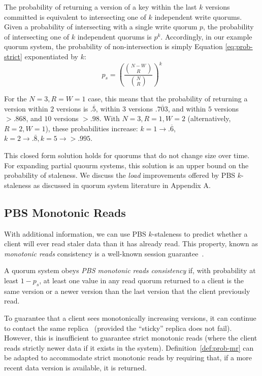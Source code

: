 \documentclass{vldb}
\begin{document}
The probability of returning a version of a key within the last $k$
versions committed is equivalent to intersecting one of $k$
independent write quorums.  Given a probability of intersecting with a
single write quorum $p$, the probability of intersecting one of $k$
independent quorums is $p^k$.  Accordingly, in our example quorum
system, the probability of non-intersection is simply Equation
\ref{eq:prob-strict} exponentiated by $k$:
\begin{equation}
\label{eq:k-consistency}
p_{s} = \left(\frac{{N-W \choose R}}{{N \choose R}}\right)^k
\end{equation}

For the $N=3, R=W=1$ case, this means that the probability of
returning a version within $2$ versions is $.\overline{5}$, within $3$
versions $.\overline{703}$, and within $5$ versions $> .868$, and $10$
versions $>.98$.  With $N=3, R=1, W=2$ (alternatively, $R=2, W=1$),
these probabilities increase: $k=1 \rightarrow
.\overline{6}$, $k=2 \rightarrow .\overline{8}, k=5 \rightarrow >
.995$.

This closed form solution holds for quorums that do not change size
over time.  For expanding partial quourm systems, this solution is an
upper bound on the probability of staleness.  We discuss the
\textit{load} improvements offered by PBS $k$-staleness as discussed
in quorum system literature in Appendix A.

\subsection{PBS Monotonic Reads}

With additional information, we can use PBS $k$-staleness to predict
whether a client will ever read staler data than it has already read.
This property, known as \textit{monotonic reads} consistency is a
well-known session guarantee~\cite{sessionguarantees}.

\begin{definition}
\label{def:prob-mr}
A quorum system obeys \textit{PBS monotonic reads consistency} if,
with probability at least $1-p_{s}$, at least one value in any
read quorum returned to a client is the same version or a newer
version than the last version that the client previously read.
\end{definition}

To guarantee that a client sees monotonically increasing versions, it
can continue to contact the same replica~\cite{vogels-defs} (provided
the ``sticky'' replica does not fail).  However, this is insufficient to
guarantee strict monotonic reads (where the client reads strictly
newer data if it exists in the system).  Definition~\ref{def:prob-mr}
can be adapted to accommodate strict monotonic reads by requiring
that, if a more recent data version is available, it is returned.
\end{document}

